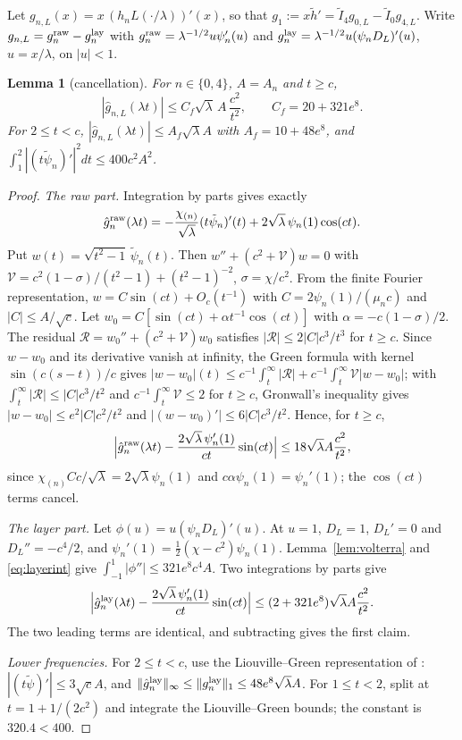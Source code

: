 \documentclass[11pt]{amsart}
\newtheorem{lemma}[proposition]{Lemma}
\theoremstyle{remark}
\numberwithin{equation}{section}
\begin{document}
Let $g_{n,L}(x)=x\,(h_nL(\cdot/\lambda))'(x)$, so that $g_1:=x\tilde h'=\tilde I_4g_{0,L}-\tilde I_0g_{4,L}$. Write $g_{n,L}=g_n^{\rm raw}-g_n^{\rm lay}$ with $g_n^{\rm raw}=\lambda^{-1/2}u\psi_n'(u)$ and $g_n^{\rm lay}=\lambda^{-1/2}u(\psi_nD_L)'(u)$, $u=x/\lambda$, on $|u|<1$.

\begin{lemma}[cancellation]\label{lem:cancel}
For $n\in\{0,4\}$, $A=A_n$ and $t\ge c$,
\[
|\hat g_{n,L}(\lambda t)|\le C_f\sqrt\lambda\,A\,\frac{c^2}{t^2},\qquad C_f=20+321e^8.
\]
For $2\le t<c$, $|\hat g_{n,L}(\lambda t)|\le A_f\sqrt\lambda A$ with $A_f=10+48e^8$, and $\int_1^2|(t\tilde\psi_n)'|^2dt\le400c^2A^2$.
\end{lemma}
\begin{proof}
\emph{The raw part.} Integration by parts gives exactly
\[
\hat g_n^{\rm raw}(\lambda t)=-\frac{\chi_{(n)}}{\sqrt\lambda}(t\tilde\psi_n)'(t)+2\sqrt\lambda\,\psi_n(1)\cos(ct).
\]
Put $w(t)=\sqrt{t^2-1}\,\tilde\psi_n(t)$. Then $w''+(c^2+\mathcal V)w=0$ with $\mathcal V=c^2(1-\sigma)/(t^2-1)+(t^2-1)^{-2}$, $\sigma=\chi/c^2$. From the finite Fourier representation, $w=C\sin(ct)+O_c(t^{-1})$ with $C=2\psi_n(1)/(\mu_nc)$ and $|C|\le A/\sqrt c$. Let $w_0=C[\sin(ct)+\alpha t^{-1}\cos(ct)]$ with $\alpha=-c(1-\sigma)/2$. The residual $\mathcal R=w_0''+(c^2+\mathcal V)w_0$ satisfies $|\mathcal R|\le2|C|c^3/t^3$ for $t\ge c$. Since $w-w_0$ and its derivative vanish at infinity, the Green formula with kernel $\sin(c(s-t))/c$ gives $|w-w_0|(t)\le c^{-1}\int_t^\infty|\mathcal R|+c^{-1}\int_t^\infty\mathcal V|w-w_0|$; with $\int_t^\infty|\mathcal R|\le|C|c^3/t^2$ and $c^{-1}\int_t^\infty\mathcal V\le2$ for $t\ge c$, Gronwall's inequality gives $|w-w_0|\le e^2|C|c^2/t^2$ and $|(w-w_0)'|\le6|C|c^3/t^2$. Hence, for $t\ge c$,
\[
\Bigl|\hat g_n^{\rm raw}(\lambda t)-\frac{2\sqrt\lambda\,\psi_n'(1)}{ct}\sin(ct)\Bigr|\le18\sqrt\lambda A\frac{c^2}{t^2},
\]
since $\chi_{(n)}Cc/\sqrt\lambda=2\sqrt\lambda\psi_n(1)$ and $c\alpha\psi_n(1)=\psi_n'(1)$; the $\cos(ct)$ terms cancel.

\emph{The layer part.} Let $\phi(u)=u(\psi_nD_L)'(u)$. At $u=1$, $D_L=1$, $D_L'=0$ and $D_L''=-c^4/2$, and $\psi_n'(1)=\frac12(\chi-c^2)\psi_n(1)$. Lemma~\ref{lem:volterra} and \eqref{eq:layerint} give $\int_{-1}^1|\phi''|\le321e^8c^4A$. Two integrations by parts give
\[
\Bigl|\hat g_n^{\rm lay}(\lambda t)-\frac{2\sqrt\lambda\,\psi_n'(1)}{ct}\sin(ct)\Bigr|\le(2+321e^8)\sqrt\lambda A\frac{c^2}{t^2}.
\]
The two leading terms are identical, and subtracting gives the first claim.

\emph{Lower frequencies.} For $2\le t<c$, use the Liouville--Green representation of \cite[Lemmas~3.2 and~3.5]{MoriWeilII}: $|(t\tilde\psi)'|\le3\sqrt cA$, and $\|\hat g_n^{\rm lay}\|_\infty\le\|g_n^{\rm lay}\|_1\le48e^8\sqrt\lambda A$. For $1\le t<2$, split at $t=1+1/(2c^2)$ and integrate the Liouville--Green bounds; the constant is $320.4<400$.
\end{proof}
\end{document}
